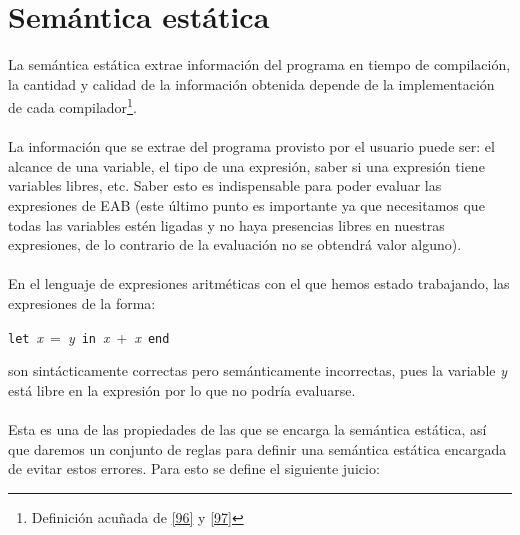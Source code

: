     \section{Semántica estática}
    La semántica estática extrae información del programa en tiempo de compilación, la cantidad y calidad de la información obtenida depende de la implementación de cada compilador\footnote{Definición acuñada de \hyperlink{96}{[96]} y \hyperlink{97}{[97]}}. \\\\
    La información que se extrae del programa provisto por el usuario puede ser: el alcance de una variable, el tipo de una expresión, saber si una expresión tiene variables libres, etc. Saber esto es indispensable  para poder evaluar las expresiones de \textsf{EAB} (este último punto es importante ya que necesitamos que todas las variables estén ligadas y no haya presencias libres en nuestras expresiones, de lo contrario de la evaluación no se obtendrá valor alguno).\\\\
    En el lenguaje de expresiones aritméticas con el que hemos estado trabajando, las expresiones de la forma:
        \begin{center}
                \texttt{let}\ \textit{x}\ =\ \textit{y}\ \texttt{in}\ \textit{x}\ +\ \textit{x}\ \texttt{end}
        \end{center}
    son sintácticamente correctas pero semánticamente incorrectas, pues la variable \textit{y} está libre en la expresión por lo que no podría evaluarse.\\\\
    Esta es una de las propiedades de las que se encarga la semántica estática, así que daremos un conjunto de reglas para definir una semántica estática encargada de evitar estos errores. Para esto se define el siguiente juicio: 

    \bigskip
    
